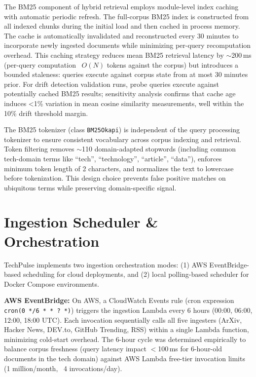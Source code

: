 The BM25 component of hybrid retrieval employs module-level index caching with automatic periodic refresh. The full-corpus BM25 index is constructed from all indexed chunks during the initial load and then cached in process memory. The cache is automatically invalidated and reconstructed every 30 minutes to incorporate newly ingested documents while minimizing per-query recomputation overhead. This caching strategy reduces mean BM25 retrieval latency by $\sim$200\,ms (per-query computation ~$O(N)$ tokens against the corpus) but introduces a bounded staleness: queries execute against corpus state from at most 30 minutes prior. For drift detection validation runs, probe queries execute against potentially cached BM25 results; sensitivity analysis confirms that cache age induces <1\% variation in mean cosine similarity measurements, well within the 10\% drift threshold margin.

The BM25 tokenizer (class \texttt{BM25Okapi}) is independent of the query processing tokenizer to ensure consistent vocabulary across corpus indexing and retrieval. Token filtering removes $\sim$110 domain-adapted stopwords (including common tech-domain terms like ``tech'', ``technology'', ``article'', ``data''), enforces minimum token length of 2 characters, and normalizes the text to lowercase before tokenization. This design choice prevents false positive matches on ubiquitous terms while preserving domain-specific signal.

\section{Ingestion Scheduler \& Orchestration}
\label{sec:scheduler}

TechPulse implements two ingestion orchestration modes: (1) AWS EventBridge-based scheduling for cloud deployments, and (2) local polling-based scheduler for Docker Compose environments.

\noindent\textbf{AWS EventBridge:} On AWS, a CloudWatch Events rule (cron expression \texttt{cron(0 */6 * * ? *)}) triggers the ingestion Lambda every 6 hours (00:00, 06:00, 12:00, 18:00 UTC). Each invocation sequentially calls all five ingesters (ArXiv, Hacker News, DEV.to, GitHub Trending, RSS) within a single Lambda function, minimizing cold-start overhead. The 6-hour cycle was determined empirically to balance corpus freshness (query latency impact $<$100\,ms for 6-hour-old documents in the tech domain) against AWS Lambda free-tier invocation limits (1 million/month, ~4 invocations/day).


